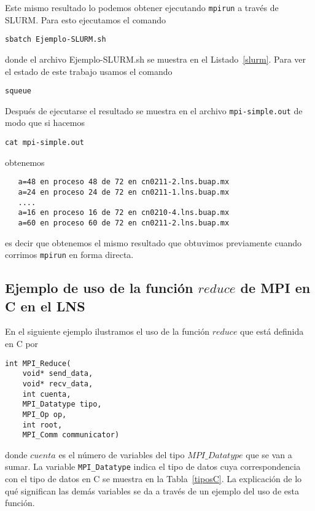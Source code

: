 \documentclass[letter]{jpconf}
\begin{document}
Este mismo resultado lo podemos obtener ejecutando  \texttt{mpirun} a trav\'es de SLURM. Para esto ejecutamos el comando
\color{brown}
\begin{verbatim}
sbatch Ejemplo-SLURM.sh
\end{verbatim}
\color{black}
donde el archivo Ejemplo-SLURM.sh se muestra en el Listado~\ref{slurm}. Para ver el estado de este trabajo usamos el comando
\color{blue}
\begin{verbatim}
squeue
\end{verbatim}
\color{black}
Despu\'es de ejecutarse el resultado se muestra en el
archivo \texttt{mpi-simple.out} de modo que si hacemos
\color{blue}
\begin{verbatim}
cat mpi-simple.out
\end{verbatim}
\color{black}
obtenemos
\color{brown}
\begin{verbatim}
   a=48 en proceso 48 de 72 en cn0211-2.lns.buap.mx
   a=24 en proceso 24 de 72 en cn0211-1.lns.buap.mx
   ....
   a=16 en proceso 16 de 72 en cn0210-4.lns.buap.mx
   a=60 en proceso 60 de 72 en cn0211-2.lns.buap.mx
\end{verbatim}
\color{black}
es decir que obtenemos el mismo resultado que obtuvimos previamente cuando corrimos \texttt{mpirun} en forma directa.




\subsection{Ejemplo de uso de la funci\'on $reduce$ de MPI en C en el LNS}

En el siguiente ejemplo ilustramos el uso de la 
 funci\'on $reduce$ que 
est\'a definida en C por
\color{black}
\begin{verbatim}
int MPI_Reduce(
    void* send_data,
    void* recv_data,
    int cuenta,
    MPI_Datatype tipo,
    MPI_Op op,
    int root,
    MPI_Comm communicator)
\end{verbatim}
\color{black}
donde $cuenta$ es el n\'umero de variables del tipo  $MPI\_Datatype$ que se van a sumar. La variable \texttt{MPI\_Datatype} indica el tipo de datos cuya correspondencia con el tipo de datos en C se muestra en la Tabla~\ref{tiposC}.  La explicaci\'on de lo qu\'e significan las dem\'as variables se da a trav\'es de un 
ejemplo del uso de esta funci\'on.
\end{document}
